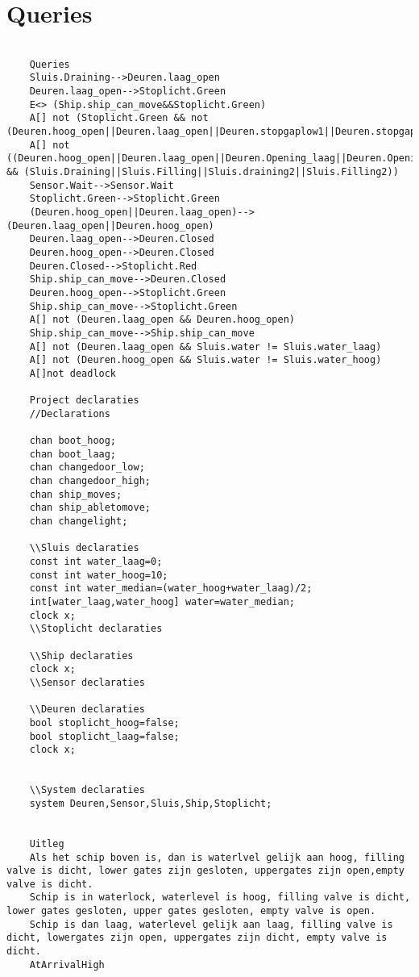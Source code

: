 \chapter{Queries}
\begin{verbatim}
	
	Queries
	Sluis.Draining-->Deuren.laag_open
	Deuren.laag_open-->Stoplicht.Green
	E<> (Ship.ship_can_move&&Stoplicht.Green)
	A[] not (Stoplicht.Green && not (Deuren.hoog_open||Deuren.laag_open||Deuren.stopgaplow1||Deuren.stopgaplow2||Deuren.stopgaphigh1||Deuren.stopgaphigh2))
	A[] not ((Deuren.hoog_open||Deuren.laag_open||Deuren.Opening_laag||Deuren.Opening_hoog||Deuren.Closing_hoog||Deuren.Closing_laag) && (Sluis.Draining||Sluis.Filling||Sluis.draining2||Sluis.Filling2))
	Sensor.Wait-->Sensor.Wait
	Stoplicht.Green-->Stoplicht.Green
	(Deuren.hoog_open||Deuren.laag_open)-->(Deuren.laag_open||Deuren.hoog_open)
	Deuren.laag_open-->Deuren.Closed
	Deuren.hoog_open-->Deuren.Closed
	Deuren.Closed-->Stoplicht.Red
	Ship.ship_can_move-->Deuren.Closed
	Deuren.hoog_open-->Stoplicht.Green
	Ship.ship_can_move-->Stoplicht.Green
	A[] not (Deuren.laag_open && Deuren.hoog_open)
	Ship.ship_can_move-->Ship.ship_can_move
	A[] not (Deuren.laag_open && Sluis.water != Sluis.water_laag)
	A[] not (Deuren.hoog_open && Sluis.water != Sluis.water_hoog)
	A[]not deadlock
	
	Project declaraties
	//Declarations
	
	chan boot_hoog;
	chan boot_laag;
	chan changedoor_low;
	chan changedoor_high;
	chan ship_moves;
	chan ship_abletomove;
	chan changelight;
	
	\\Sluis declaraties
	const int water_laag=0;
	const int water_hoog=10;
	const int water_median=(water_hoog+water_laag)/2;
	int[water_laag,water_hoog] water=water_median;
	clock x;
	\\Stoplicht declaraties
	
	\\Ship declaraties
	clock x;
	\\Sensor declaraties
	
	\\Deuren declaraties
	bool stoplicht_hoog=false;
	bool stoplicht_laag=false;
	clock x;
	
	
	\\System declaraties
	system Deuren,Sensor,Sluis,Ship,Stoplicht;
	
	
	Uitleg
	Als het schip boven is, dan is waterlvel gelijk aan hoog, filling valve is dicht, lower gates zijn gesloten, uppergates zijn open,empty valve is dicht. 
	Schip is in waterlock, waterlevel is hoog, filling valve is dicht, lower gates gesloten, upper gates gesloten, empty valve is open. 
	Schip is dan laag, waterlevel gelijk aan laag, filling valve is dicht, lowergates zijn open, uppergates zijn dicht, empty valve is dicht.
	AtArrivalHigh
	

\end{verbatim}
